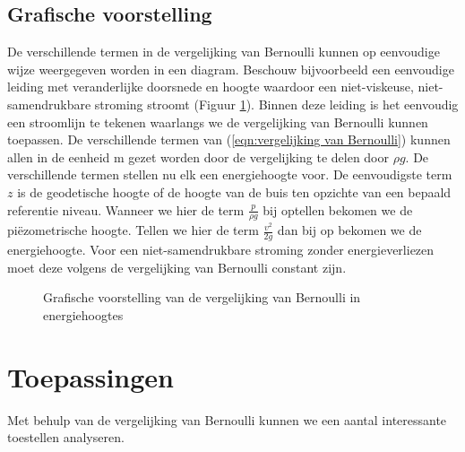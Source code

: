 		\subsection{Grafische voorstelling}
De verschillende termen in de vergelijking van Bernoulli kunnen op eenvoudige wijze weergegeven worden in een diagram. Beschouw bijvoorbeeld een eenvoudige leiding met veranderlijke doorsnede en hoogte waardoor een niet-viskeuse, niet-samendrukbare stroming stroomt (Figuur \ref{fig:energiehoogte}). Binnen deze leiding is het eenvoudig een stroomlijn te tekenen waarlangs we de vergelijking van Bernoulli kunnen toepassen. De verschillende termen van (\ref{eqn:vergelijking van Bernoulli}) kunnen allen in de eenheid \unit{}{m} gezet worden door de vergelijking te delen door $\rho g$. De verschillende termen stellen nu elk een energiehoogte voor. De eenvoudigste term $z$ is de geodetische hoogte of de hoogte van de buis ten opzichte van een bepaald referentie niveau. Wanneer we hier de term $\frac{p}{\rho g}$ bij optellen bekomen we de pi\"ezometrische hoogte. Tellen we hier de term $\frac{v^2}{2 g}$ dan bij op bekomen we de energiehoogte. Voor een niet-samendrukbare stroming zonder energieverliezen moet deze volgens de vergelijking van Bernoulli constant zijn.
\begin{figure}[htb]
	\centering
	
	\caption{Grafische voorstelling van de vergelijking van Bernoulli in energiehoogtes}
	\label{fig:energiehoogte}
\end{figure}

	\section{Toepassingen}
Met behulp van de vergelijking van Bernoulli kunnen we een aantal interessante toestellen analyseren.
